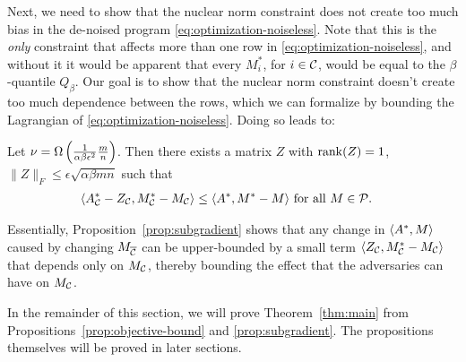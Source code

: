 Next, we need to show that the nuclear norm constraint does 
not create too much bias in the de-noised program 
\eqref{eq:optimization-noiseless}. Note that this is the \emph{only} constraint 
that affects more than one row in \eqref{eq:optimization-noiseless}, and without 
it it would be apparent that every $M^*_i$, for $i \in \mathcal{C}$, would be equal to the 
$\beta$-quantile $Q_{\beta}$. Our goal is to show that the nuclear norm 
constraint doesn't create too much dependence between the rows, which we can 
formalize by bounding the Lagrangian of \eqref{eq:optimization-noiseless}. 
Doing so leads to:

\begin{proposition}
\label{prop:subgradient}
Let $\nu = \Omega\left( \frac{1}{\alpha\beta\epsilon^2}\frac{m}{n} \right)$. Then there exists a matrix $Z$ with 
$\operatorname{rank}(Z) = 1$, $\|Z\|_F \leq \epsilon \sqrt{\alpha\beta mn}$ such that
\begin{align}
\langle A^*_{\mathcal{C}} - Z_{\mathcal{C}}, M^*_{\mathcal{C}} - M_{\mathcal{C}} \rangle &\leq \langle A^*, M^* - M \rangle \text{ for all $M \in \mathcal{P}$}.
\end{align}
\end{proposition}
Essentially, Proposition~\ref{prop:subgradient} shows that any change in 
$\langle A^*, M \rangle$ caused by changing $M_{\overline{\mathcal{C}}}$ can be upper-bounded 
by a small term $\langle Z_{\mathcal{C}}, M^*_{\mathcal{C}} - M_{\mathcal{C}} \rangle$ that depends only 
on $M_{\mathcal{C}}$, thereby bounding the effect that the adversaries can have 
on $M_{\mathcal{C}}$. 

In the remainder of this section, we will prove Theorem~\ref{thm:main} from Propositions~\ref{prop:objective-bound} 
and \ref{prop:subgradient}. The propositions themselves will be proved in later sections.

